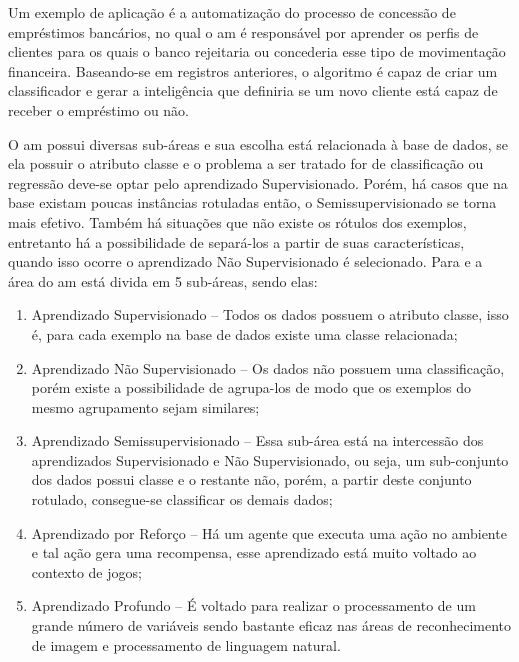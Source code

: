     Um exemplo de aplicação é a automatização do processo de concessão de empréstimos bancários, no qual o \ac{am} é responsável por aprender os perfis de clientes para os quais o banco rejeitaria ou concederia esse tipo de movimentação financeira. Baseando\hyp{se} em registros anteriores, o algoritmo é capaz de criar um classificador e gerar a inteligência que definiria se um novo cliente está capaz de receber o empréstimo ou não. 
    
    
    O \ac{am} possui diversas sub\hyp{áreas} e sua escolha está relacionada à base de dados, se ela possuir o atributo classe e o problema a ser tratado for de classificação ou regressão deve\hyp{se} optar pelo aprendizado Supervisionado. Porém, há casos que na base existam poucas instâncias rotuladas então, o Semissupervisionado se torna mais efetivo. Também há situações que não existe os rótulos dos exemplos, entretanto há a possibilidade de separá\hyp{los} a partir de suas características, quando isso ocorre o aprendizado Não Supervisionado é selecionado. Para  e  a área do \ac{am} está divida em 5 sub\hyp{áreas}, sendo elas: 
    \begin{enumerate}[label=\roman*.]
        \item Aprendizado Supervisionado {--} Todos os dados possuem o atributo classe, isso é, para cada exemplo na base de dados existe uma classe relacionada;
        \item Aprendizado Não Supervisionado {--} Os dados não possuem uma classificação, porém existe a possibilidade de agrupa\hyp{los} de modo que os exemplos do mesmo agrupamento sejam similares;
        \item Aprendizado Semissupervisionado {--} Essa sub\hyp{área} está na intercessão dos aprendizados Supervisionado e Não Supervisionado, ou seja, um sub-conjunto dos dados possui classe e o restante não, porém, a partir deste conjunto rotulado, consegue\hyp{se} classificar os demais dados;
        \item Aprendizado por Reforço {--} Há um agente que executa uma ação no ambiente e tal ação gera uma recompensa, esse aprendizado está muito voltado ao contexto de jogos;
        \item Aprendizado Profundo {--} É voltado para realizar o processamento de um grande número de variáveis sendo bastante eficaz nas áreas de reconhecimento de imagem e processamento de linguagem natural.
    \end{enumerate}
    
